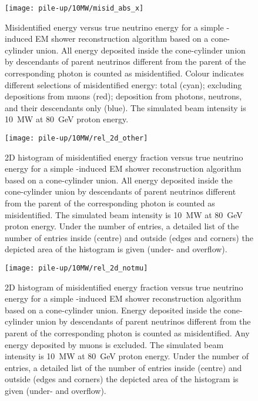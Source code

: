 \begin{figure}[htb]
	\centering
	\texttt{[image: pile-up/10MW/misid\_abs\_x]}
	\caption{Misidentified energy versus true neutrino energy for a simple \Pgpz-induced EM shower reconstruction algorithm based on a cone-cylinder union.
		All energy deposited inside the cone-cylinder union by descendants of parent neutrinos different from the parent of the corresponding \Pgpz photon is counted as misidentified.
		Colour indicates different selections of misidentified energy: total (cyan); excluding depositions from muons (red); deposition from photons, neutrons, and their descendants only (blue).
		The simulated beam intensity is \SI{10}{\mega\watt} at \SI{80}{\giga\electronvolt} proton energy.}
\end{figure}

\begin{figure}[htb]
	\centering
	\texttt{[image: pile-up/10MW/rel\_2d\_other]}
	\caption{2D histogram of misidentified energy fraction versus true neutrino energy for a simple \Pgpz-induced EM shower reconstruction algorithm based on a cone-cylinder union.
		All energy deposited inside the cone-cylinder union by descendants of parent neutrinos different from the parent of the corresponding \Pgpz photon is counted as misidentified.
		The simulated beam intensity is \SI{10}{\mega\watt} at \SI{80}{\giga\electronvolt} proton energy.
		Under the number of entries, a detailed list of the number of entries inside (centre) and outside (edges and corners) the depicted area of the histogram is given (under- and overflow).}
\end{figure}

\begin{figure}[htb]
	\centering
	\texttt{[image: pile-up/10MW/rel\_2d\_notmu]}
	\caption{2D histogram of misidentified energy fraction versus true neutrino energy for a simple \Pgpz-induced EM shower reconstruction algorithm based on a cone-cylinder union.
		Energy deposited inside the cone-cylinder union by descendants of parent neutrinos different from the parent of the corresponding \Pgpz photon is counted as misidentified.
		Any energy deposited by muons is excluded.
		The simulated beam intensity is \SI{10}{\mega\watt} at \SI{80}{\giga\electronvolt} proton energy.
		Under the number of entries, a detailed list of the number of entries inside (centre) and outside (edges and corners) the depicted area of the histogram is given (under- and overflow).}
\end{figure}

